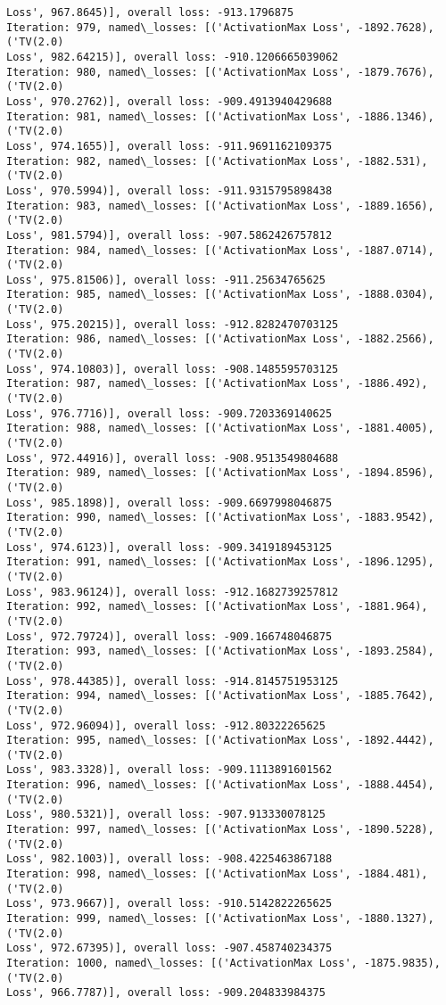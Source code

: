 \documentclass[10pt]{article}
\begin{document}
\begin{Verbatim}[commandchars=\\\{\}]
Loss', 967.8645)], overall loss: -913.1796875
Iteration: 979, named\_losses: [('ActivationMax Loss', -1892.7628), ('TV(2.0)
Loss', 982.64215)], overall loss: -910.1206665039062
Iteration: 980, named\_losses: [('ActivationMax Loss', -1879.7676), ('TV(2.0)
Loss', 970.2762)], overall loss: -909.4913940429688
Iteration: 981, named\_losses: [('ActivationMax Loss', -1886.1346), ('TV(2.0)
Loss', 974.1655)], overall loss: -911.9691162109375
Iteration: 982, named\_losses: [('ActivationMax Loss', -1882.531), ('TV(2.0)
Loss', 970.5994)], overall loss: -911.9315795898438
Iteration: 983, named\_losses: [('ActivationMax Loss', -1889.1656), ('TV(2.0)
Loss', 981.5794)], overall loss: -907.5862426757812
Iteration: 984, named\_losses: [('ActivationMax Loss', -1887.0714), ('TV(2.0)
Loss', 975.81506)], overall loss: -911.25634765625
Iteration: 985, named\_losses: [('ActivationMax Loss', -1888.0304), ('TV(2.0)
Loss', 975.20215)], overall loss: -912.8282470703125
Iteration: 986, named\_losses: [('ActivationMax Loss', -1882.2566), ('TV(2.0)
Loss', 974.10803)], overall loss: -908.1485595703125
Iteration: 987, named\_losses: [('ActivationMax Loss', -1886.492), ('TV(2.0)
Loss', 976.7716)], overall loss: -909.7203369140625
Iteration: 988, named\_losses: [('ActivationMax Loss', -1881.4005), ('TV(2.0)
Loss', 972.44916)], overall loss: -908.9513549804688
Iteration: 989, named\_losses: [('ActivationMax Loss', -1894.8596), ('TV(2.0)
Loss', 985.1898)], overall loss: -909.6697998046875
Iteration: 990, named\_losses: [('ActivationMax Loss', -1883.9542), ('TV(2.0)
Loss', 974.6123)], overall loss: -909.3419189453125
Iteration: 991, named\_losses: [('ActivationMax Loss', -1896.1295), ('TV(2.0)
Loss', 983.96124)], overall loss: -912.1682739257812
Iteration: 992, named\_losses: [('ActivationMax Loss', -1881.964), ('TV(2.0)
Loss', 972.79724)], overall loss: -909.166748046875
Iteration: 993, named\_losses: [('ActivationMax Loss', -1893.2584), ('TV(2.0)
Loss', 978.44385)], overall loss: -914.8145751953125
Iteration: 994, named\_losses: [('ActivationMax Loss', -1885.7642), ('TV(2.0)
Loss', 972.96094)], overall loss: -912.80322265625
Iteration: 995, named\_losses: [('ActivationMax Loss', -1892.4442), ('TV(2.0)
Loss', 983.3328)], overall loss: -909.1113891601562
Iteration: 996, named\_losses: [('ActivationMax Loss', -1888.4454), ('TV(2.0)
Loss', 980.5321)], overall loss: -907.913330078125
Iteration: 997, named\_losses: [('ActivationMax Loss', -1890.5228), ('TV(2.0)
Loss', 982.1003)], overall loss: -908.4225463867188
Iteration: 998, named\_losses: [('ActivationMax Loss', -1884.481), ('TV(2.0)
Loss', 973.9667)], overall loss: -910.5142822265625
Iteration: 999, named\_losses: [('ActivationMax Loss', -1880.1327), ('TV(2.0)
Loss', 972.67395)], overall loss: -907.458740234375
Iteration: 1000, named\_losses: [('ActivationMax Loss', -1875.9835), ('TV(2.0)
Loss', 966.7787)], overall loss: -909.204833984375
    \end{Verbatim}
\end{document}
